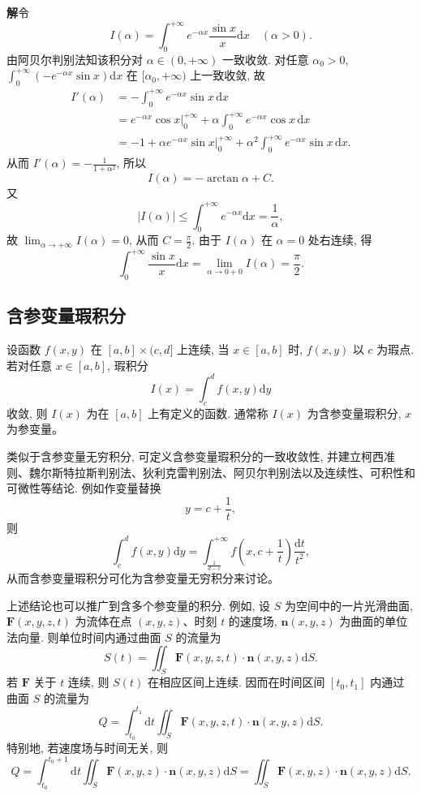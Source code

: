 \documentclass[UTF8,12pt,a4paper,fontset=fandol]{ctexart}
\begin{document}
\noindent\textbf{解}\quad 令
\[
  I(\alpha)=\int_0^{+\infty}e^{-\alpha x}\frac{\sin x}{x}\mathrm dx\quad(\alpha>0).
\]
由阿贝尔判别法知该积分对 $\alpha\in(0,+\infty)$ 一致收敛. 对任意 $\alpha_0>0$, $\int_0^{+\infty}(-e^{-\alpha x}\sin x)\mathrm dx$ 在 $[\alpha_0,+\infty)$ 上一致收敛, 故
\[
\begin{aligned}
  I'(\alpha)
  &=-\int_0^{+\infty}e^{-\alpha x}\sin x\,\mathrm dx\\
  &=e^{-\alpha x}\cos x\Big|_0^{+\infty}
    +\alpha\int_0^{+\infty}e^{-\alpha x}\cos x\,\mathrm dx\\
  &=-1+\alpha e^{-\alpha x}\sin x\Big|_0^{+\infty}
    +\alpha^2\int_0^{+\infty}e^{-\alpha x}\sin x\,\mathrm dx.
\end{aligned}
\]
从而 $I'(\alpha)=-\frac1{1+\alpha^2}$, 所以
\[
  I(\alpha)=-\arctan\alpha+C.
\]
又
\[
  |I(\alpha)|\leqslant\int_0^{+\infty}e^{-\alpha x}\mathrm dx=\frac1\alpha,
\]
故 $\lim_{\alpha\to+\infty}I(\alpha)=0$, 从而 $C=\frac\pi2$. 由于 $I(\alpha)$ 在 $\alpha=0$ 处右连续, 得
\[
  \int_0^{+\infty}\frac{\sin x}{x}\mathrm dx
  =\lim_{\alpha\to0+0}I(\alpha)=\frac\pi2.
\]

\subsection{含参变量瑕积分}

设函数 $f(x,y)$ 在 $[a,b]\times(c,d]$ 上连续, 当 $x\in[a,b]$ 时, $f(x,y)$ 以 $c$ 为瑕点. 若对任意 $x\in[a,b]$, 瑕积分
\begin{equation}
  I(x)=\int_c^d f(x,y)\mathrm dy
  \tag{17.2.4}
\end{equation}
收敛, 则 $I(x)$ 为在 $[a,b]$ 上有定义的函数. 通常称 $I(x)$ 为含参变量瑕积分, $x$ 为参变量。

类似于含参变量无穷积分, 可定义含参变量瑕积分的一致收敛性, 并建立柯西准则、魏尔斯特拉斯判别法、狄利克雷判别法、阿贝尔判别法以及连续性、可积性和可微性等结论. 例如作变量替换
\[
  y=c+\frac1t,
\]
则
\[
  \int_c^d f(x,y)\mathrm dy
  =
  \int_{\frac1{d-c}}^{+\infty}
  f\left(x,c+\frac1t\right)\frac{\mathrm dt}{t^2},
\]
从而含参变量瑕积分可化为含参变量无穷积分来讨论。

上述结论也可以推广到含多个参变量的积分. 例如, 设 $S$ 为空间中的一片光滑曲面, $\mathbf F(x,y,z,t)$ 为流体在点 $(x,y,z)$、时刻 $t$ 的速度场, $\mathbf n(x,y,z)$ 为曲面的单位法向量. 则单位时间内通过曲面 $S$ 的流量为
\[
  S(t)=\iint_S \mathbf F(x,y,z,t)\cdot\mathbf n(x,y,z)\mathrm dS.
\]
若 $\mathbf F$ 关于 $t$ 连续, 则 $S(t)$ 在相应区间上连续. 因而在时间区间 $[t_0,t_1]$ 内通过曲面 $S$ 的流量为
\[
  Q=\int_{t_0}^{t_1}\mathrm dt
  \iint_S \mathbf F(x,y,z,t)\cdot\mathbf n(x,y,z)\mathrm dS.
\]
特别地, 若速度场与时间无关, 则
\[
  Q=\int_{t_0}^{t_0+1}\mathrm dt
  \iint_S \mathbf F(x,y,z)\cdot\mathbf n(x,y,z)\mathrm dS
  =\iint_S \mathbf F(x,y,z)\cdot\mathbf n(x,y,z)\mathrm dS.
\]
\end{document}
